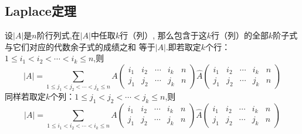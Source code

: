 \subsection{Laplace定理}
\begin{theorem}[Laplace定理]\label{thm:Laplace}
  设$|A|$是$n$阶行列式,在$|A|$中任取$k$行（列）,
  那么包含于这$k$行（列）的全部$k$阶子式与它们对应的代数余子式的成绩之和
  等于$|A|$.即若取定$k$个行：$1 \leq i_1 < i_2 < \cdots < i_k \leq n$,则
  \begin{equation}
    \label{eq:Determinant11}
    |A|=\sum\limits_{1 \leq j_1 < j_2 < \cdots < j_k \leq n}
    A\begin{pmatrix}i_1 & i_2 & \cdots & i_k & n\\
        j_1 & j_2 & \cdots & j_k & n\end{pmatrix}
    \widehat{A}\begin{pmatrix}i_1 & i_2 & \cdots & i_k & n\\
        j_1 & j_2 & \cdots & j_k & n\end{pmatrix}
  \end{equation}
  同样若取定$k$个列：$1 \leq j_1 < j_2 < \cdots < j_k \leq n$,则
  \begin{equation}
    \label{eq:Determinant12}
    |A|=\sum\limits_{1 \leq i_1 < i_2 < \cdots < i_k \leq n}
    A\begin{pmatrix}i_1 & i_2 & \cdots & i_k & n\\
        j_1 & j_2 & \cdots & j_k & n\end{pmatrix}
    \widehat{A}\begin{pmatrix}i_1 & i_2 & \cdots & i_k & n\\
        j_1 & j_2 & \cdots & j_k & n\end{pmatrix}
  \end{equation}
\end{theorem}

